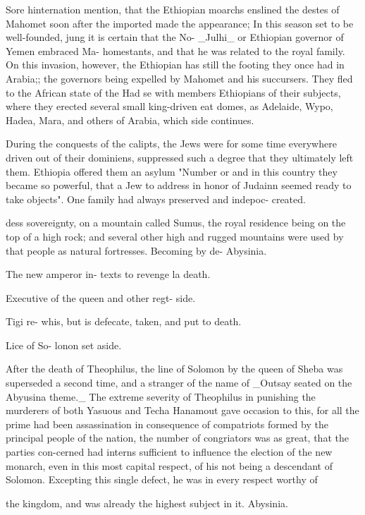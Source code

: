 \documentclass{article}
\begin{document}
Sore hinternation mention, that the Ethiopian moarchs enslined the destes of Mahomet soon after the imported made the appearance; In this season set to be well-founded, jung it is certain that the No- \_Julhi\_ or Ethiopian governor of Yemen embraced Ma- homestants, and that he was related to the royal family. On this invasion, however, the Ethiopian has still the footing they once had in Arabia;; the governors being expelled by Mahomet and his succursers. They fled to the African state of the Had se with members Ethiopians of their subjects, where they erected several small king-driven eat domes, as Adelaide, Wypo, Hadea, Mara, and others of Arabia, which side continues.

During the conquests of the calipts, the Jews were for some time everywhere driven out of their dominiens, suppressed such a degree that they ultimately left them. Ethiopia offered them an asylum "Number or and in this country they became so powerful, that a Jew to address in honor of Judainn seemed ready to take objects". One family had always preserved and indepoc- created.

dess sovereignty, on a mountain called Sumus, the royal residence being on the top of a high rock; and several other high and rugged mountains were used by that people as natural fortresses. Becoming by de- Abysinia.

The new amperor in- texts to revenge la death.

Executive of the queen and other regt- side.

Tigi re- whis, but is defecate, taken, and put to death.

Lice of So- lonon set aside.

After the death of Theophilus, the line of Solomon by the queen of Sheba was superseded a second time, and a stranger of the name of \_Outsay seated on the Abyusina theme.\_ The extreme severity of Theophilus in punishing the murderers of both Yasuous and Techa Hanamout gave occasion to this, for all the prime had been assassination in consequence of compatriots formed by the principal people of the nation, the number of congriators was as great, that the parties con-cerned had interns sufficient to influence the election of the new monarch, even in this most capital respect, of his not being a descendant of Solomon. Excepting this single defect, he was in every respect worthy of

the kingdom, and was already the highest subject in it. Abysinia.
\end{document}
